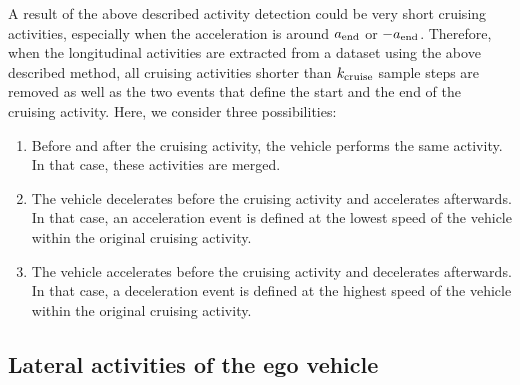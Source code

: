 A result of the above described activity detection could be very short cruising activities, especially when the acceleration is around $a_\mathrm{end}$ or $-a_\mathrm{end}$. Therefore, when the longitudinal activities are extracted from a dataset using the above described method, all cruising activities shorter than $k_\mathrm{cruise}$ sample steps are removed as well as the two events that define the start and the end of the cruising activity. Here, we consider three possibilities:
\begin{enumerate}
	\item Before and after the cruising activity, the vehicle performs the same activity. In that case, these activities are merged.
	\item The vehicle decelerates before the cruising activity and accelerates afterwards. In that case, an acceleration event is defined at the lowest speed of the vehicle within the original cruising activity.
	\item The vehicle accelerates before the cruising activity and decelerates afterwards. In that case, a deceleration event is defined at the highest speed of the vehicle within the original cruising activity.
\end{enumerate}



\subsection{Lateral activities of the ego vehicle}
\label{sec:lateral ego}


